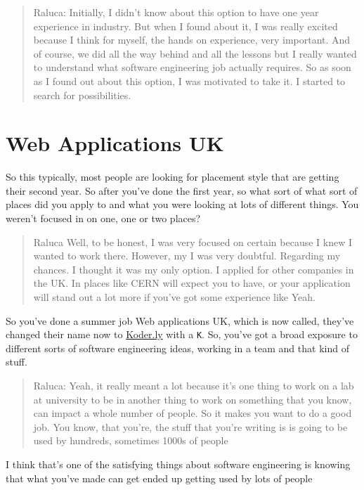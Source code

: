 \documentclass[
]{book}
\begin{document}
\begin{quote}
Raluca: Initially, I didn't know about this option to have one year experience in industry. But when I found about it, I was really excited because I think for myself, the hands on experience, very important. And of course, we did all the way behind and all the lessons but I really wanted to understand what software engineering job actually requires. So as soon as I found out about this option, I was motivated to take it. I started to search for possibilities.
\end{quote}

\hypertarget{web-applications-uk}{%
\section{Web Applications UK}\label{web-applications-uk}}

So this typically, most people are looking for placement style that are getting their second year. So after you've done the first year, so what sort of what sort of places did you apply to and what you were looking at lots of different things. You weren't focused in on one, one or two places?

\begin{quote}
Raluca Well, to be honest, I was very focused on certain because I knew I wanted to work there. However, my I was very doubtful. Regarding my chances. I thought it was my only option. I applied for other companies in the UK. In places like CERN will expect you to have, or your application will stand out a lot more if you've got some experience like Yeah.
\end{quote}

So you've done a summer job Web applications UK, which is now called, they've changed their name now to \href{https://www.koder.ly/}{Koder.ly} with a \texttt{K}. So, you've got a broad exposure to different sorts of software engineering ideas, working in a team and that kind of stuff.

\begin{quote}
Raluca: Yeah, it really meant a lot because it's one thing to work on a lab at university to be in another thing to work on something that you know, can impact a whole number of people. So it makes you want to do a good job. You know, that you're, the stuff that you're writing is is going to be used by hundreds, sometimes 1000s of people
\end{quote}

I think that's one of the satisfying things about software engineering is knowing that what you've made can get ended up getting used by lots of people
\end{document}
